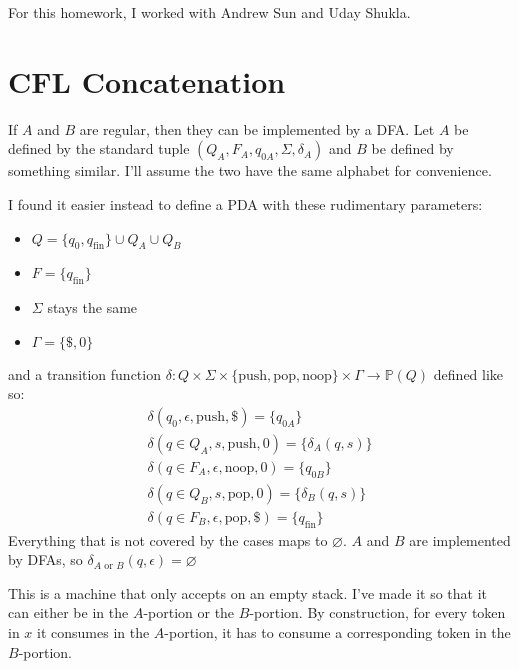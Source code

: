 \documentclass[12pt]{article}
\begin{document}
\hspace{0pt}
\vfill
\begin{center}
    For this homework, I worked with Andrew Sun and Uday Shukla.
\end{center}
\vfill
\hspace{0pt}

\pagebreak

\section{CFL Concatenation}

If $A$ and $B$ are regular, then they can be implemented by a DFA.
Let $A$ be defined by the standard tuple $(Q_A, F_A, q_{0A}, \Sigma, \delta_A)$
and $B$ be defined by something similar.
I'll assume the two have the same alphabet for convenience.

I found it easier instead to define a PDA with these rudimentary parameters:
\begin{itemize}
    \item $Q=\{q_0, q_{\text{fin}}\} \cup Q_A \cup Q_B$
    \item $F=\{q_{\text{fin}}\}$
    \item $\Sigma$ stays the same
    \item $\Gamma=\{\$, 0\}$
\end{itemize}
and a transition function
$\delta: Q \times \Sigma \times \{\text{push}, \text{pop}, \text{noop}\} \times \Gamma \rightarrow \mathbb{P}(Q)$
defined like so:
\begin{gather*}
    \delta(q_0, \epsilon, \text{push}, \$)=\{q_{0A}\} \\
    \delta(q \in Q_A, s, \text{push}, 0)=\{\delta_A(q, s)\} \\
    \delta(q \in F_A, \epsilon, \text{noop}, 0)=\{q_{0B}\} \\
    \delta(q \in Q_B, s, \text{pop}, 0)=\{\delta_B(q, s)\} \\
    \delta(q \in F_B, \epsilon, \text{pop}, \$)=\{q_{\text{fin}}\}
\end{gather*}
Everything that is not covered by the cases maps to $\varnothing$.
$A$ and $B$ are implemented by DFAs, so $\delta_{A\text{ or }B}(q, \epsilon)=\varnothing$

This is a machine that only accepts on an empty stack.
I've made it so that it can either be in the $A$-portion or the $B$-portion.
By construction, for every token in $x$ it consumes in the $A$-portion,
it has to consume a corresponding token in the $B$-portion.
\end{document}
